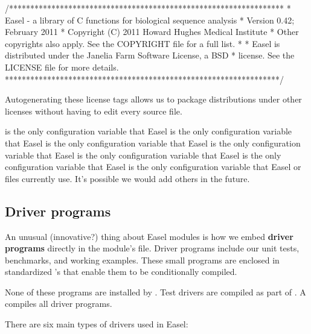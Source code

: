 \begin{cchunk}
/*****************************************************************
 * Easel - a library of C functions for biological sequence analysis
 * Version 0.42; February 2011
 * Copyright (C) 2011 Howard Hughes Medical Institute
 * Other copyrights also apply. See the COPYRIGHT file for a full list.
 *
 * Easel is distributed under the Janelia Farm Software License, a BSD
 * license. See the LICENSE file for more details.
 *****************************************************************/
\end{cchunk}

Autogenerating these license tags allows us to package distributions
under other licenses without having to edit every source file.

 is the only configuration variable that Easel
 is the only configuration variable that Easel
 is the only configuration variable that Easel
 is the only configuration variable that Easel
\ccode{} is the only configuration variable that Easel
 is the only configuration variable that Easel
 is the only configuration variable that Easel
 or  files currently use. It's possible we would
add others in the future.


\subsection{Driver programs}

An unusual (innovative?) thing about Easel modules is how we embed
{\bfseries driver programs} directly in the module's 
file. Driver programs include our unit tests, benchmarks, and working
examples. These small programs are enclosed in standardized
's that enable them to be conditionally compiled.

None of these programs are installed by .  Test
drivers are compiled as part of .  A  compiles all driver programs.

There are six main types of drivers used in Easel:

